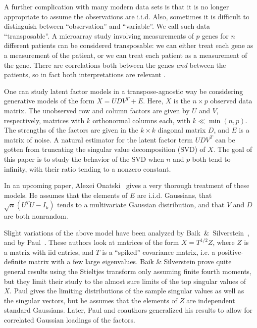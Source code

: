 A further complication with many modern data sets is that it is no longer
appropriate to assume the observations are i.i.d. Also, sometimes it is
difficult to distinguish between ``observation'' and ``variable''. We call such
data ``transposable''. A microarray study involving measurements of $p$ genes
for $n$ different patients can be considered transposable: we can either treat
each gene as a measurement of the patient, or we can treat each patient as a
measurement of the gene. There are correlations both between the genes
\emph{and} between the patients, so in fact both interpretations are relevant
\cite{efron2008smi}.

One can study latent factor models in a transpose-agnostic way be considering
generative models of the form $X = U D V^T + E$. Here, $X$ is the $n \times p$
observed data matrix. The unobserved row and column factors are given by $U$
and $V$, respectively, matrices with $k$ orthonormal columns each, with $k \ll
\min(n,p)$. The strengths of the factors are given in the $k\times k$ diagonal
matrix $D$, and $E$ is a matrix of noise. A natural estimator for the latent
factor term $U D V^T$ can be gotten from truncating the singular value
decomposition (SVD) \cite{golub1996mc} of $X$. The goal of this paper is to
study the behavior of the SVD when $n$ and $p$ both tend to infinity, with
their ratio tending to a nonzero constant.

In an upcoming paper, Alexei Onatski~\cite{onatski} gives a very thorough 
treatment of these models.  He assumes that the elements of $E$ are i.i.d.
Gaussians, that $\sqrt{n} ( U^T U - I_k) $ tends to a multivariate Gaussian
distribution, and that $V$ and $D$ are both nonrandom.

Slight variations of the above model have been analyzed by
Baik~\&~Silverstein~\cite{baik2006els}, and by Paul~\cite{paul2007ase}. These
authors look at matrices of the form $X = T^{1/2} Z$, where $Z$ is a matrix with
iid entries, and $T$ is a ``spiked'' covariance matrix, i.e. a positive-definite
matrix with a few large eigenvalues. Baik \& Silverstein prove quite general
results using the Stieltjes transform only assuming finite fourth moments, but
they limit their study to the almost sure limits of the top singular values of
$X$. Paul gives the limiting distributions of the sample singular values as well
as the singular vectors, but he assumes that the elements of $Z$ are independent
standard Gaussians. Later, Paul and coauthors \cite{paul} generalized his
results to allow for correlated Gaussian loadings of the factors.

